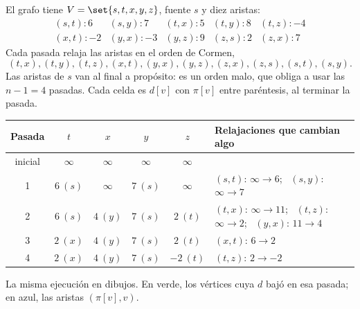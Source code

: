 \documentclass[11pt,letterpaper]{article}
\begin{document}
\begin{ejemplo}
  \label{ej:bellman-ford-24-4}
  El grafo tiene $V = \set{s, t, x, y, z}$, fuente $s$ y diez aristas:
  \[
    \begin{array}{lllll}
      (s, t) : 6 & (s, y) : 7 & (t, x) : 5 & (t, y) : 8
        & (t, z) : -4 \\
      (x, t) : -2 & (y, x) : -3 & (y, z) : 9 & (z, s) : 2
        & (z, x) : 7
    \end{array}
  \]
  Cada pasada relaja las aristas en el orden de Cormen,
  \[
    (t, x), (t, y), (t, z), (x, t), (y, x), (y, z), (z, x), (z, s),
    (s, t), (s, y) .
  \]
  Las aristas de $s$ van al final a propósito: es un orden malo, que
  obliga a usar las $n - 1 = 4$ pasadas. Cada celda es $d[v]$ con
  $\pi[v]$ entre paréntesis, al terminar la pasada.
  \begin{center}
  \small
  \begin{tabular}{cccccl}
    \toprule
    \textbf{Pasada} & $t$ & $x$ & $y$ & $z$
      & \textbf{Relajaciones que cambian algo} \\
    \midrule
    inicial & $\infty$ & $\infty$ & $\infty$ & $\infty$ & \\
    1 & $6\ (s)$ & $\infty$ & $7\ (s)$ & $\infty$
      & $(s, t)$: $\infty \to 6$; \ $(s, y)$: $\infty \to 7$ \\
    2 & $6\ (s)$ & $4\ (y)$ & $7\ (s)$ & $2\ (t)$
      & $(t, x)$: $\infty \to 11$; \ $(t, z)$: $\infty \to 2$;
        \ $(y, x)$: $11 \to 4$ \\
    3 & $2\ (x)$ & $4\ (y)$ & $7\ (s)$ & $2\ (t)$
      & $(x, t)$: $6 \to 2$ \\
    4 & $2\ (x)$ & $4\ (y)$ & $7\ (s)$ & $-2\ (t)$
      & $(t, z)$: $2 \to -2$ \\
    \bottomrule
  \end{tabular}
  \end{center}
  La misma ejecución en dibujos. En verde, los vértices cuya $d$ bajó
  en esa pasada; en azul, las aristas $(\pi[v], v)$.
  \begin{center}
\end{center}
\end{ejemplo}
\end{document}
